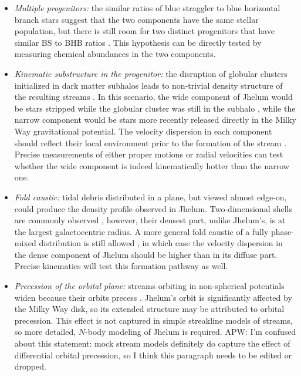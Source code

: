 \documentclass[twocolumn]{aastex62}
\newcommand{\apw}[1]{{\color{blue} APW: #1}}
\begin{document}
\begin{itemize}
 \item{\emph{Multiple progenitors:} the similar ratios of blue straggler to blue horizontal branch stars suggest that the two components have the same stellar population, but there is still room for two distinct progenitors that have similar BS to BHB ratios \citep[e.g., a low-mass globular cluster and a low-mass dwarf galaxy,][]{deason2015}.
 This hypothesis can be directly tested by measuring chemical abundances in the two components.
 }
 \item{\emph{Kinematic substructure in the progenitor:} the disruption of globular clusters initialized in dark matter subhalos leads to non-trivial density structure of the resulting streams \citep[e.g.,][]{penarrubia2017, carlberg2018}.
 In this scenario, the wide component of Jhelum would be stars stripped while the globular cluster was still in the subhalo \citep[similar to the recently reported GD-1 cocoon,][]{malhan2019}, while the narrow component would be stars more recently released directly in the Milky Way gravitational potential.
 The velocity dispersion in each component should reflect their local environment prior to the formation of the stream \citep[e.g.,][]{fardal2015}.
 Precise measurements of either proper motions or radial velocities can test whether the wide component is indeed kinematically hotter than the narrow one.
 }
 \item{\emph{Fold caustic:} tidal debris distributed in a plane, but viewed almost edge-on, could produce the density profile observed in Jhelum.
 Two-dimensional shells are commonly observed \citep[e.g.,][]{tal2009,kadofong2018}, however, their densest part, unlike Jhelum's, is at the largest galactocentric radius.
 A more general fold caustic of a fully phase-mixed distribution is still allowed \citep[e.g.,][]{tremaine1999}, in which case the velocity dispersion in the dense component of Jhelum should be higher than in its diffuse part.
 Precise kinematics will test this formation pathway as well.
 }
 \item{\emph{Precession of the orbital plane:} streams orbiting in non-spherical potentials widen because their orbits precess \citep[e.g.,][]{erkal2016, dehnen2018}.
 Jhelum's orbit is significantly affected by the Milky Way disk, so its extended structure may be attributed to orbital precession.
 This effect is not captured in simple streakline models of streams, so more detailed, $N$-body modeling of Jhelum is required.
 \apw{I'm confused about this statement: mock stream models definitely do capture the effect of differential orbital precession, so I think this paragraph needs to be edited or dropped.}
}
\end{itemize}
\end{document}
